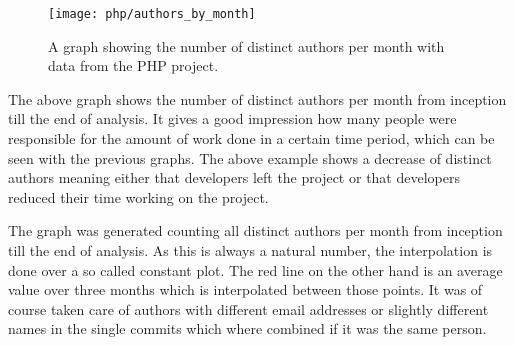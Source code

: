 \begin{figure}[h!]
  \centering
  \texttt{[image: php/authors\_by\_month]}
  \caption{A graph showing the number of distinct authors per month with data
  from the PHP project.}
\end{figure}

The above graph shows the number of distinct authors per month from inception
till the end of analysis. It gives a good impression how many people were
responsible for the amount of work done in a certain time period, which can be
seen with the previous graphs. The above example shows a decrease of distinct
authors meaning either that developers left the project or that developers
reduced their time working on the project.

The graph was generated counting all distinct authors per month from inception
till the end of analysis. As this is always a natural number, the interpolation
is done over a so called constant plot. The red line on the other hand is an
average value over three months which is interpolated between those points. It
was of course taken care of authors with different email addresses or slightly
different names in the single commits which where combined if it was the same
person.



